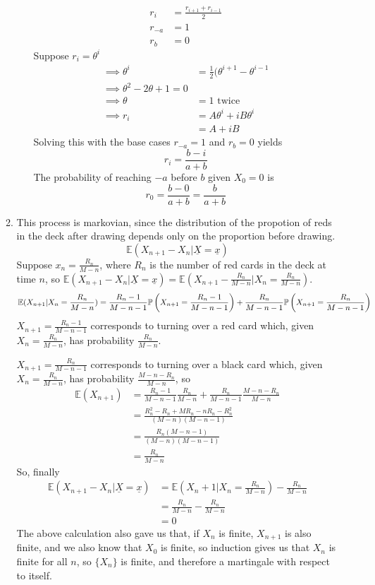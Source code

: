 \documentclass{article}
\begin{document}
\begin{enumerate}
\begin{enumerate}
\begin{enumerate}
\begin{align*}
r_i &= \frac{r_{i+1}+r_{i-1}}{2}\\
r_{-a} &= 1\\
r_b &= 0
\end{align*}
Suppose $r_i= \theta^i$
\begin{align*}
\implies \theta^i &= \frac{1}{2}(\theta^{i+1}-\theta^{i-1}\\
\implies \theta^2 -2\theta +1 = 0\\
\implies \theta &= 1 \mbox{ twice}\\
\implies r_i &= A\theta^i +iB\theta^i\\
&= A+iB
\end{align*}
Solving this with the base cases $r_{-a}=1$ and $r_{b}=0$ yields
$$
r_i = \frac{b-i}{a+b}
$$
The probability of reaching $-a$ before $b$ given $X_0 = 0$ is
$$
r_0 = \frac{b-0}{a+b} = \frac{b}{a+b}
$$
\end{enumerate}
\item
This process is markovian, since the distribution of the propotion of reds in
the deck after drawing depends only on the proportion before drawing.
$$
\mathbb{E}(X_{n+1} - X_n | \underline{X} = \underline{x})
$$
Suppose $x_n = \frac{R_n}{M-n}$, where $R_n$ is the number of red cards in the
deck at time $n$, so $\mathbb{E}(X_{n+1} - X_n | \underline{X} = \underline{x})
= \mathbb{E}(X_{n+1} - \frac{R_n}{M-n}| X_n = \frac{R_n}{M-n})$.
$$
\mathbb{E}(X_{n+1} | X_n = \frac{R_n}{M-n}) =
\frac{R_n-1}{M-n-1}\mathbb{P}\left(X_{n+1} = \frac{R_n-1}{M-n-1}\right) +
\frac{R_n}{M-n-1} \mathbb{P} \left( X_{n+1} = \frac{R_n}{M-n-1}\right)
$$
$X_{n+1} = \frac{R_n-1}{M-n-1}$ corresponds to turning over a red card which,
given $X_n = \frac{R_n}{M-n}$, has probability $\frac{R_n}{M-n}$.

$X_{n+1} = \frac{R_n}{M-n-1}$ corresponds to turning over a black card which,
given $X_n = \frac{R_n}{M-n}$, has probability $\frac{M-n-R_n}{M-n}$, so
\begin{align*}
\mathbb{E}(X_{n+1}) &= \frac{R_n-1}{M-n-1}\frac{R_n}{M-n} + \frac{R_n}{M-n-1}
\frac{M-n-R_n}{M-n}\\
&= \frac{R_n^2 - R_n + MR_n - nR_n - R_n^2}{(M-n)(M-n-1)}\\
&= \frac{R_n(M-n-1)}{(M-n)(M-n-1)}\\
&= \frac{R_n}{M-n}
\end{align*}
So, finally
\begin{align*}
\mathbb{E}(X_{n+1}-X_n | \underline{X} = \underline{x}) &=
\mathbb{E}\left(X_n+1|X_n = \frac{R_n}{M-n}\right) - \frac{R_n}{M-n}\\
&= \frac{R_n}{M-n} - \frac{R_n}{M-n}\\
&= 0
\end{align*}
The above calculation also gave us that, if $X_n$ is finite, $X_{n+1}$ is also
finite, and we also know that $X_0$ is finite, so induction gives us that $X_n$
is finite for all $n$, so $\{X_n\}$ is finite, and therefore a martingale with
respect to itself.
\end{enumerate}
\end{enumerate}
\clearpage
\end{document}
